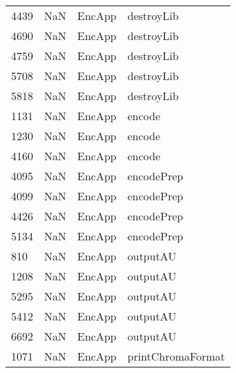 \begin{tabular}{llll}
4439 &                   NaN &                     EncApp &                                destroyLib \\
4690 &                   NaN &                     EncApp &                                destroyLib \\
4759 &                   NaN &                     EncApp &                                destroyLib \\
5708 &                   NaN &                     EncApp &                                destroyLib \\
5818 &                   NaN &                     EncApp &                                destroyLib \\
1131 &                   NaN &                     EncApp &                                    encode \\
1230 &                   NaN &                     EncApp &                                    encode \\
4160 &                   NaN &                     EncApp &                                    encode \\
4095 &                   NaN &                     EncApp &                                encodePrep \\
4099 &                   NaN &                     EncApp &                                encodePrep \\
4426 &                   NaN &                     EncApp &                                encodePrep \\
5134 &                   NaN &                     EncApp &                                encodePrep \\
810  &                   NaN &                     EncApp &                                  outputAU \\
1208 &                   NaN &                     EncApp &                                  outputAU \\
5295 &                   NaN &                     EncApp &                                  outputAU \\
5412 &                   NaN &                     EncApp &                                  outputAU \\
6692 &                   NaN &                     EncApp &                                  outputAU \\
1071 &                   NaN &                     EncApp &                         printChromaFormat \\

\end{tabular}
